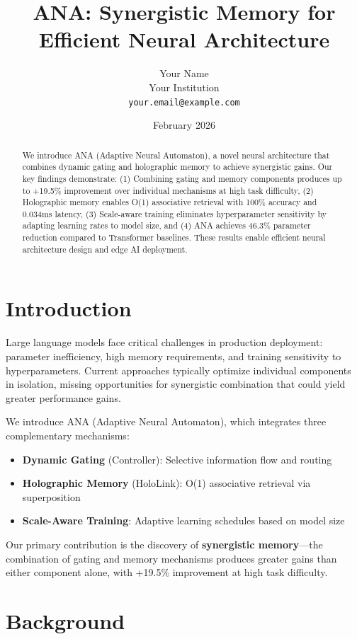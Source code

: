\documentclass[10pt]{article}
\title{\textbf{ANA: Synergistic Memory for Efficient Neural Architecture}}
\author{Your Name\\
Your Institution\\
\texttt{your.email@example.com}
}
\date{February 2026}
\begin{document}
\maketitle

\begin{abstract}
We introduce ANA (Adaptive Neural Automaton), a novel neural architecture that combines dynamic gating and holographic memory to achieve synergistic gains. Our key findings demonstrate: (1) Combining gating and memory components produces up to +19.5\% improvement over individual mechanisms at high task difficulty, (2) Holographic memory enables O(1) associative retrieval with 100\% accuracy and 0.034ms latency, (3) Scale-aware training eliminates hyperparameter sensitivity by adapting learning rates to model size, and (4) ANA achieves 46.3\% parameter reduction compared to Transformer baselines. These results enable efficient neural architecture design and edge AI deployment.
\end{abstract}

\section{Introduction}

Large language models face critical challenges in production deployment: parameter inefficiency, high memory requirements, and training sensitivity to hyperparameters. Current approaches typically optimize individual components in isolation, missing opportunities for synergistic combination that could yield greater performance gains.

We introduce ANA (Adaptive Neural Automaton), which integrates three complementary mechanisms:
\begin{itemize}
    \item \textbf{Dynamic Gating} (Controller): Selective information flow and routing
    \item \textbf{Holographic Memory} (HoloLink): O(1) associative retrieval via superposition
    \item \textbf{Scale-Aware Training}: Adaptive learning schedules based on model size
\end{itemize}

Our primary contribution is the discovery of \textbf{synergistic memory}—the combination of gating and memory mechanisms produces greater gains than either component alone, with +19.5\% improvement at high task difficulty.

\section{Background}
\end{document}
